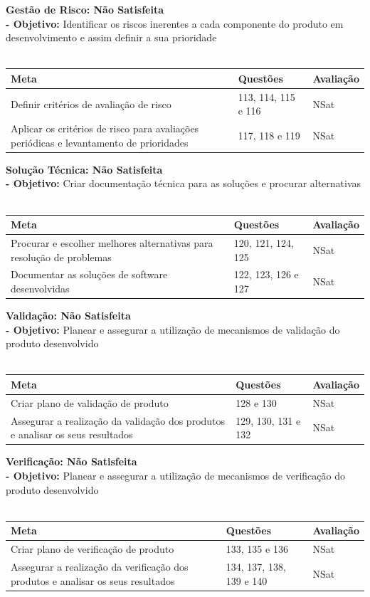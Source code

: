 \documentclass[openany,10pt,a4paper]{article}
\begin{document}
\textbf{Gestão de Risco: Não Satisfeita} \\ 
\textbf{- Objetivo:} Identificar os riscos inerentes a cada componente do produto em desenvolvimento e assim definir a sua prioridade \\
\\
\begin{tabular}{|p{3.7in}|p{1in}|p{1in}|}		 \hline
\textbf{Meta} & \textbf{Questões} & \textbf{Avaliação} \\ \hline
Definir critérios de avaliação de risco & 113, 114, 115 e 116 & NSat \\
Aplicar os critérios de risco para avaliações periódicas e levantamento de prioridades & 117, 118 e 119 & NSat \\ \hline
\end{tabular}

\textbf{Solução Técnica: Não Satisfeita} \\ 
\textbf{- Objetivo:} Criar documentação técnica para as soluções e procurar alternativas \\
\\
\begin{tabular}{|p{3.7in}|p{1in}|p{1in}|} \hline		
\textbf{Meta} & \textbf{Questões} & \textbf{Avaliação} \\ \hline
Procurar e escolher melhores alternativas para resolução de problemas & 120, 121, 124, 125 & NSat \\
Documentar as soluções de software desenvolvidas & 122, 123, 126 e 127 & NSat \\ \hline
\end{tabular}

\textbf{Validação: Não Satisfeita} \\ 
\textbf{- Objetivo:} Planear e assegurar a utilização de mecanismos de validação do produto desenvolvido \\
\\
\begin{tabular}{|p{3.7in}|p{1in}|p{1in}|}	\hline	
\textbf{Meta} & \textbf{Questões} & \textbf{Avaliação} \\ \hline
Criar plano de validação de produto & 128 e 130 & NSat \\
Assegurar a realização da validação dos produtos e analisar os seus resultados & 129, 130, 131 e 132 & NSat \\ \hline
\end{tabular}

\textbf{Verificação: Não Satisfeita} \\ 
\textbf{- Objetivo:} Planear e assegurar a utilização de mecanismos de verificação do produto desenvolvido \\
\\
\begin{tabular}{|p{3.7in}|p{1in}|p{1in}|}		\hline
\textbf{Meta} & \textbf{Questões} & \textbf{Avaliação} \\ \hline
Criar plano de verificação de produto & 133, 135 e 136 & NSat \\
Assegurar a realização da verificação dos produtos e analisar os seus resultados & 134, 137, 138, 139 e 140 & NSat \\ \hline
\end{tabular}
\end{document}
